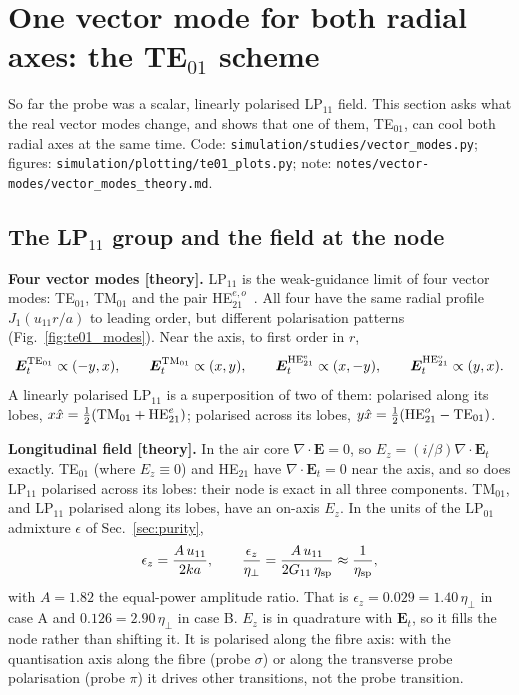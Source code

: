 \documentclass[11pt,a4paper]{article}
\newcommand{\etaeff}{\eta_{\perp}}
\begin{document}
\section{One vector mode for both radial axes: the TE$_{01}$ scheme}
\label{sec:te01}\hypertarget{d:te01}{}
So far the probe was a scalar, linearly polarised LP$_{11}$ field. This section asks what the real vector modes change, and shows that one of them, TE$_{01}$, can cool both radial axes at the same time. Code: \texttt{simulation/studies/vector\_modes.py}; figures: \texttt{simulation/plotting/te01\_plots.py}; note: \texttt{notes/vector-modes/vector\_modes\_theory.md}.

\subsection{The LP$_{11}$ group and the field at the node}
\label{sec:te01_modes}
\textbf{Four vector modes [theory].} LP$_{11}$ is the weak-guidance limit of four vector modes: TE$_{01}$, TM$_{01}$ and the pair HE$_{21}^{e,o}$~\cite{snyder1983,ramachandran2013}. All four have the same radial profile $J_1(u_{11}r/a)$ to leading order, but different polarisation patterns (Fig.~\ref{fig:te01_modes}). Near the axis, to first order in $r$,
\begin{equation}
  \bm E_t^{\rm TE_{01}}\propto(-y,x),\qquad \bm E_t^{\rm TM_{01}}\propto(x,y),\qquad \bm E_t^{\rm HE_{21}^e}\propto(x,-y),\qquad \bm E_t^{\rm HE_{21}^o}\propto(y,x).
\end{equation}
A linearly polarised LP$_{11}$ is a superposition of two of them: polarised along its lobes, $x\hat x=\tfrac12({\rm TM}_{01}+{\rm HE}_{21}^e)$; polarised across its lobes, $y\hat x=\tfrac12({\rm HE}_{21}^o-{\rm TE}_{01})$.

\textbf{Longitudinal field [theory].} In the air core $\nabla\cdot\bm E=0$, so $E_z=(i/\beta)\nabla\cdot\bm E_t$ exactly. TE$_{01}$ (where $E_z\equiv0$) and HE$_{21}$ have $\nabla\cdot\bm E_t=0$ near the axis, and so does LP$_{11}$ polarised across its lobes: their node is exact in all three components. TM$_{01}$, and LP$_{11}$ polarised along its lobes, have an on-axis $E_z$. In the units of the LP$_{01}$ admixture $\epsilon$ of Sec.~\ref{sec:purity},
\begin{equation}
  \epsilon_z=\frac{A\,u_{11}}{2ka},\qquad \frac{\epsilon_z}{\etaeff}=\frac{A\,u_{11}}{2G_{11}\,\eta_{\rm sp}}\approx\frac{1}{\eta_{\rm sp}},
\end{equation}
with $A=1.82$ the equal-power amplitude ratio. That is $\epsilon_z=0.029=1.40\,\etaeff$ in case A and $0.126=2.90\,\etaeff$ in case B. $E_z$ is in quadrature with $\bm E_t$, so it fills the node rather than shifting it. It is polarised along the fibre axis: with the quantisation axis along the fibre (probe $\sigma$) or along the transverse probe polarisation (probe $\pi$) it drives other transitions, not the probe transition.
\end{document}
